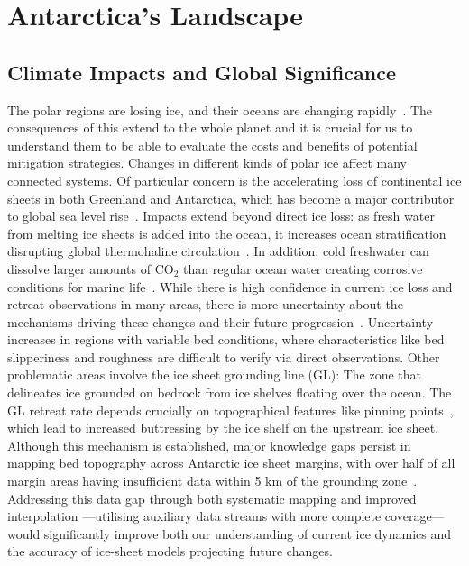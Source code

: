 \chapter{Antarctica's Landscape}\label{why}
\section{Climate Impacts and Global Significance}
The polar regions are losing ice, and their oceans are changing rapidly~\cite{O_C_in_changingClimate}. The consequences of this extend to the whole planet and it is crucial for us to understand them to be able to evaluate the costs and benefits of potential mitigation strategies. 
Changes in different kinds of polar ice affect many connected systems. Of particular concern is the accelerating loss of continental ice sheets in both Greenland and Antarctica, which has become a major contributor to global sea level rise~\cite{O_C_in_changingClimate}. Impacts extend beyond direct ice loss: as fresh water from melting ice sheets is added into the ocean, it increases ocean stratification disrupting global thermohaline circulation~\cite{Jacobs_2004}. In addition, cold freshwater can dissolve larger amounts of $\mathrm{CO_2}$ than regular ocean water creating corrosive conditions for marine life~\cite{O_C_in_changingClimate}.
While there is high confidence in current ice loss and retreat observations in many areas, there is more uncertainty about the mechanisms driving these changes and their future progression~\cite{Fox-Kemper_2021}. Uncertainty increases in regions with variable bed conditions, where characteristics like bed slipperiness and roughness are difficult to verify via direct observations. Other problematic areas involve the ice sheet grounding line (GL): The zone that delineates ice grounded on bedrock from ice shelves floating over the ocean. The GL retreat rate depends crucially on topographical features like pinning points~\cite{Fox-Kemper_2021}, which lead to increased buttressing by the ice shelf on the upstream ice sheet. Although this mechanism is established, major knowledge gaps persist in mapping bed topography across Antarctic ice sheet margins, with over half of all margin areas having insufficient data within 5 km of the grounding zone~\cite{RINGS_2022}. Addressing this data gap through both systematic mapping and improved interpolation —utilising auxiliary data streams with more complete coverage— would significantly improve both our understanding of current ice dynamics and the accuracy of ice-sheet models projecting future changes.

